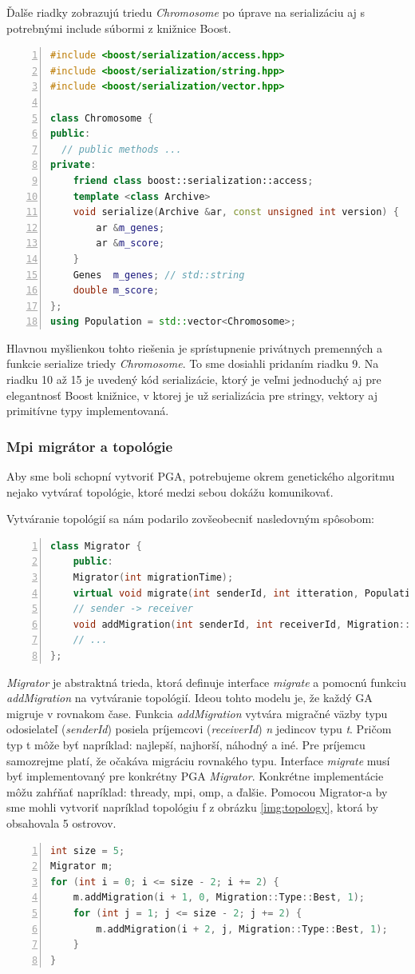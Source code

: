 Ďalše riadky zobrazujú triedu \textit{Chromosome} po úprave na serializáciu aj s potrebnými include súbormi z knižnice Boost.
\begin{lstlisting}[language={c++}, numbers={left}]
#include <boost/serialization/access.hpp>
#include <boost/serialization/string.hpp>
#include <boost/serialization/vector.hpp>

class Chromosome {
public:
  // public methods ...
private:
    friend class boost::serialization::access;
    template <class Archive>
    void serialize(Archive &ar, const unsigned int version) {
        ar &m_genes;
        ar &m_score;
    }
    Genes  m_genes; // std::string
    double m_score;
};
using Population = std::vector<Chromosome>;
\end{lstlisting}
Hlavnou myšlienkou tohto riešenia je sprístupnenie privátnych premenných a funkcie serialize triedy \textit{Chromosome}. To sme dosiahli pridaním riadku 9.
Na riadku 10 až 15 je uvedený kód serializácie, ktorý je veľmi jednoduchý aj pre elegantnosť Boost knižnice, v ktorej je už serializácia pre stringy, vektory aj primitívne typy implementovaná.

\subsubsection{Mpi migrátor a topológie}
Aby sme boli schopní vytvoriť PGA, potrebujeme okrem genetického algoritmu nejako vytvárať topológie, ktoré medzi sebou dokážu komunikovať.

Vytváranie topológií sa nám podarilo zovšeobecniť nasledovným spôsobom:
\begin{lstlisting}[language=c++, caption={Abstraktná trieda Migrator}, numbers={left}]
class Migrator {
    public:
    Migrator(int migrationTime);
    virtual void migrate(int senderId, int itteration, Population &population) = 0;
    // sender -> receiver
    void addMigration(int senderId, int receiverId, Migration::Type t, int n)
    // ...
};
\end{lstlisting}
\textit{Migrator} je abstraktná trieda, ktorá definuje interface \textit{migrate} a pomocnú funkciu \textit{addMigration} na vytváranie topológií.
Ideou tohto modelu je, že každý GA migruje v rovnakom čase.
Funkcia \textit{addMigration} vytvára migračné väzby typu odosielateľ (\textit{senderId}) posiela príjemcovi (\textit{receiverId}) \textit{n} jedincov typu \textit{t}.
Pričom typ t môže byť napríklad: najlepší, najhorší, náhodný a iné. Pre príjemcu samozrejme platí, že očakáva migráciu rovnakého typu.
Interface \textit{migrate} musí  byť implementovaný pre konkrétny PGA \textit{Migrator}. Konkrétne implementácie môžu zahŕňať napríklad: thready, \acrshort{mpi}, \acrshort{omp}, a ďalšie.
Pomocou Migrator-a by sme mohli vytvoriť napríklad topológiu f z obrázku \ref{img:topology}, ktorá by obsahovala 5 ostrovov.
\begin{lstlisting}[language={c++}, numbers=left]
int size = 5;
Migrator m;
for (int i = 0; i <= size - 2; i += 2) {
    m.addMigration(i + 1, 0, Migration::Type::Best, 1);
    for (int j = 1; j <= size - 2; j += 2) {
        m.addMigration(i + 2, j, Migration::Type::Best, 1);
    }
}
\end{lstlisting}

